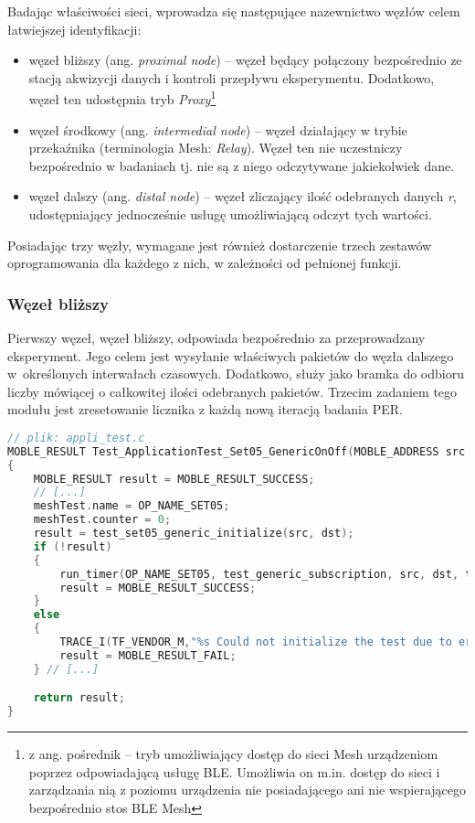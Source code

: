Badając właściwości sieci, wprowadza się następujące nazewnictwo węzłów celem łatwiejszej identyfikacji:
\begin{itemize}\label{node-naming-convention}
	\item węzeł bliższy (ang. \textit{proximal node}) -- węzeł będący połączony bezpośrednio
	ze stacją akwizycji danych i kontroli przepływu eksperymentu. Dodatkowo, węzeł ten udostępnia tryb \textit{Proxy}\footnote{z ang. pośrednik -- tryb umożliwiający dostęp do sieci Mesh urządzeniom poprzez odpowiadającą usługę BLE. Umożliwia
	on m.in. dostęp do sieci i zarządzania nią z poziomu urządzenia nie posiadającego ani nie wspierającego bezpośrednio stos BLE Mesh}
	\item węzeł środkowy (ang. \textit{intermedial node}) -- węzeł działający w trybie
	przekaźnika (terminologia Mesh: \textit{Relay}). Węzeł ten nie uczestniczy bezpośrednio w badaniach tj. nie są
	z niego odczytywane jakiekolwiek dane.
	\item węzeł dalszy (ang. \textit{distal node}) -- węzeł zliczający ilość odebranych danych \textit{r},
	udostępniający jednocześnie usługę umożliwiającą odczyt tych wartości. 
\end{itemize}

Posiadając trzy węzły, wymagane jest również dostarczenie trzech zestawów oprogramowania dla każdego z nich, w zależności
od pełnionej funkcji.

\subsubsection{Węzeł bliższy}\label{sec:proximal-node}
Pierwszy węzeł, węzeł bliższy, odpowiada bezpośrednio za przeprowadzany eksperyment. Jego celem jest wysyłanie właściwych
pakietów do węzła dalszego w~określonych interwałach czasowych. Dodatkowo, służy jako bramka do odbioru liczby mówiącej
o całkowitej ilości odebranych pakietów. Trzecim zadaniem tego modułu jest zresetowanie licznika z każdą nową iteracją
badania PER.

\begin{lstlisting}[language=C,
    caption={Kod uruchamiający sekwencję badawczą PER},
    label={lst:code_generic_onoff}]
// plik: appli_test.c
MOBLE_RESULT Test_ApplicationTest_Set05_GenericOnOff(MOBLE_ADDRESS src ,MOBLE_ADDRESS dst)
{
	MOBLE_RESULT result = MOBLE_RESULT_SUCCESS;
	// [...]
	meshTest.name = OP_NAME_SET05;
	meshTest.counter = 0;
	result = test_set05_generic_initialize(src, dst);
	if (!result)
	{
		run_timer(OP_NAME_SET05, test_generic_subscription, src, dst, test_set05_generic);
		result = MOBLE_RESULT_SUCCESS;
	}
	else
	{
		TRACE_I(TF_VENDOR_M,"%s Could not initialize the test due to error code=%d \r\n", OP_NAME_SET05, result);
		result = MOBLE_RESULT_FAIL;
	} // [...]

	return result;
}
\end{lstlisting}

